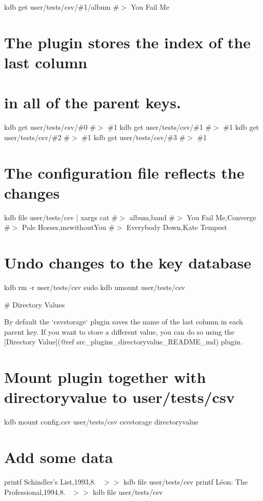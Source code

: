 kdb get user/tests/csv/\#1/album \#$>$ You Fail Me

\section*{The plugin stores the index of the last column}

\section*{in all of the parent keys.}

kdb get user/tests/csv/\#0 \#$>$ \#1 kdb get user/tests/csv/\#1 \#$>$ \#1 kdb get user/tests/csv/\#2 \#$>$ \#1 kdb get user/tests/csv/\#3 \#$>$ \#1

\section*{The configuration file reflects the changes}

kdb file user/tests/csv $\vert$ xargs cat \#$>$ album,band \#$>$ You Fail Me,Converge \#$>$ Pale Horses,mewithout\+You \#$>$ Everybody Down,Kate Tempest

\section*{Undo changes to the key database}

kdb rm -\/r user/tests/csv sudo kdb umount user/tests/csv 
\begin{DoxyCode}
# Directory Values

By default the `csvstorage` plugin saves the name of the last column in each parent key. If you want to
       store a different value, you can do
so using the [Directory Value](@ref src\_plugins\_directoryvalue\_README\_md) plugin.
\end{DoxyCode}
 \section*{Mount plugin together with {\ttfamily directoryvalue} to {\ttfamily user/tests/csv}}

kdb mount config.\+csv user/tests/csv csvstorage directoryvalue

\section*{Add some data}

printf \textquotesingle{}Schindler’s List,1993,8.~\newline
\textquotesingle{} $>$$>$ {\ttfamily kdb file user/tests/csv} printf \textquotesingle{}Léon\+: The Professional,1994,8.~\newline
\textquotesingle{} $>$$>$ {\ttfamily kdb file user/tests/csv}


